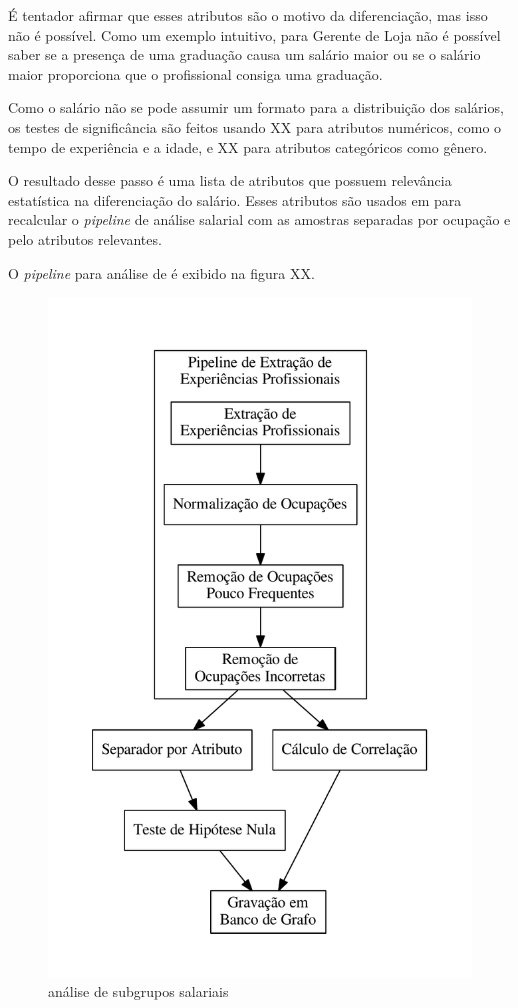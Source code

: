 \documentclass[12pt,a4paper]{article}
\begin{document}
É tentador afirmar que esses atributos são o motivo da diferenciação, mas isso não é possível. Como um exemplo intuitivo, para Gerente de Loja não é possível saber se a presença de uma graduação causa um salário maior ou se o salário maior proporciona que o profissional consiga uma graduação.

Como o salário não se pode assumir um formato para a distribuição dos salários, os testes de significância são feitos usando XX para atributos numéricos, como o tempo de experiência e a idade, e XX para atributos categóricos como gênero.

O resultado desse passo é uma lista de atributos que possuem relevância estatística na diferenciação do salário. Esses atributos são usados em para recalcular o \textit{pipeline} de análise salarial com as amostras separadas por ocupação e pelo atributos relevantes.

O \textit{pipeline} para análise de  é exibido na figura XX.

\begin{figure}[ht]
  \centering
  \includegraphics[scale=0.4]{pipeline3.pdf}
  \caption{análise de subgrupos salariais}
  \label{fig:atributo-salarial}
\end{figure}
\end{document}
